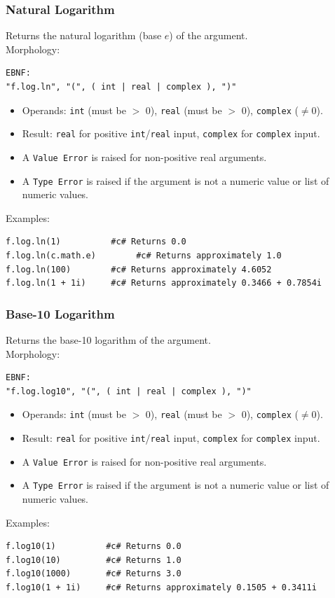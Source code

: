 \subsubsection{Natural Logarithm}
Returns the natural logarithm (base $e$) of the argument. \\
Morphology:
\begin{verbatim}
EBNF:
"f.log.ln", "(", ( int | real | complex ), ")"
\end{verbatim}
\begin{itemize}
\item Operands: \texttt{int} (must be $>$ 0), \texttt{real} (must be $>$ 0), \texttt{complex} ($\neq 0$).
\item Result: \texttt{real} for positive \texttt{int}/\texttt{real} input, \texttt{complex} for \texttt{complex} input.
\item A \texttt{Value Error} is raised for non-positive real arguments.
\item A \texttt{Type Error} is raised if the argument is not a numeric value or list of numeric values.
\end{itemize}
Examples:
\begin{verbatim}
f.log.ln(1)          #c# Returns 0.0
f.log.ln(c.math.e)        #c# Returns approximately 1.0
f.log.ln(100)        #c# Returns approximately 4.6052
f.log.ln(1 + 1i)     #c# Returns approximately 0.3466 + 0.7854i
\end{verbatim}

\subsubsection{Base-10 Logarithm}
Returns the base-10 logarithm of the argument. \\
Morphology:
\begin{verbatim}
EBNF:
"f.log.log10", "(", ( int | real | complex ), ")"
\end{verbatim}
\begin{itemize}
\item Operands: \texttt{int} (must be $>$ 0), \texttt{real} (must be $>$ 0), \texttt{complex} ($\neq 0$).
\item Result: \texttt{real} for positive \texttt{int}/\texttt{real} input, \texttt{complex} for \texttt{complex} input.
\item A \texttt{Value Error} is raised for non-positive real arguments.
\item A \texttt{Type Error} is raised if the argument is not a numeric value or list of numeric values.
\end{itemize}
Examples:
\begin{verbatim}
f.log10(1)          #c# Returns 0.0
f.log10(10)         #c# Returns 1.0
f.log10(1000)       #c# Returns 3.0
f.log10(1 + 1i)     #c# Returns approximately 0.1505 + 0.3411i
\end{verbatim}

